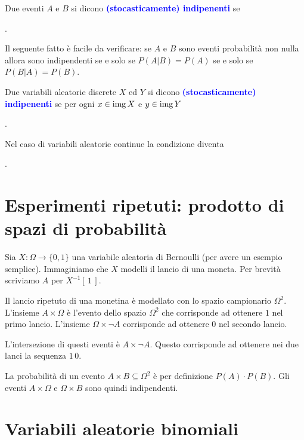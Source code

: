 \documentclass[10pt,openany]{book}
\def\range{\mathop{\rm img}}
\def\emph#1{\textcolor{blue}{\textbf{\boldmath #1}}}
\theoremstyle{mio}
\theoremstyle{liscio}
\begin{document}
Due eventi $A$ e $B$ si dicono \emph{(stocasticamente) indipenenti\/} se 

. 

Il seguente fatto è facile da verificare: se $A$ e $B$ sono eventi probabilità non nulla allora sono indipendenti se e solo se $P(A|B)=P(A)$ se e solo se $P(B|A)=P(B)$.

Due variabili aleatorie discrete $X$ ed $Y$ si dicono \emph{(stocasticamente) indipenenti\/} se per ogni $x\in\range X$ e $y\in\range Y$

.

Nel caso di variabili aleatorie continue la condizione diventa


.



\clearpage\section{Esperimenti ripetuti: prodotto di spazi di probabilità}

Sia $X:\Omega\to\{0,1\}$ una variabile aleatoria di Bernoulli (per avere un esempio semplice). Immaginiamo che $X$ modelli il lancio di una moneta. Per brevità scriviamo $A$ per $X^{-1}[\,1\,]$.

Il lancio ripetuto di una monetina è modellato con lo spazio campionario $\Omega^2$. L'insieme  $A\times\Omega$ è l'evento dello spazio $\Omega^2$ che corrisponde  ad ottenere $1$ nel primo lancio. L'insieme $\Omega\times\neg A$ corrisponde ad ottenere $0$ nel secondo lancio.

L'intersezione di questi eventi è $A\times\neg A$. Questo corrisponde ad ottenere nei due lanci la sequenza $1\,0$. 

La probabilità di un evento $A\times B\subseteq\Omega^2$ è per definizione $P(A)\cdot P(B)$. Gli eventi $A\times\Omega$ e $\Omega\times B$ sono quindi indipendenti.




\clearpage\section{Variabili aleatorie binomiali}
\end{document}
